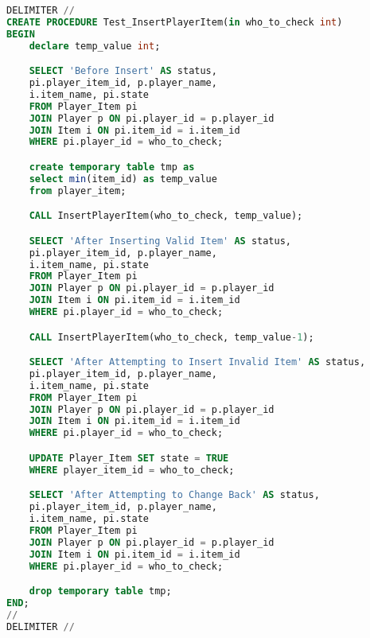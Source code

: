 \documentclass{article}
\begin{document}
\begin{lstlisting}[language=SQL]
DELIMITER //
CREATE PROCEDURE Test_InsertPlayerItem(in who_to_check int)
BEGIN
    declare temp_value int;

    SELECT 'Before Insert' AS status,
    pi.player_item_id, p.player_name,
    i.item_name, pi.state
    FROM Player_Item pi
    JOIN Player p ON pi.player_id = p.player_id
    JOIN Item i ON pi.item_id = i.item_id
    WHERE pi.player_id = who_to_check;

    create temporary table tmp as
    select min(item_id) as temp_value
    from player_item;

    CALL InsertPlayerItem(who_to_check, temp_value);

    SELECT 'After Inserting Valid Item' AS status,
    pi.player_item_id, p.player_name,
    i.item_name, pi.state
    FROM Player_Item pi
    JOIN Player p ON pi.player_id = p.player_id
    JOIN Item i ON pi.item_id = i.item_id
    WHERE pi.player_id = who_to_check;

    CALL InsertPlayerItem(who_to_check, temp_value-1);

    SELECT 'After Attempting to Insert Invalid Item' AS status,
    pi.player_item_id, p.player_name,
    i.item_name, pi.state
    FROM Player_Item pi
    JOIN Player p ON pi.player_id = p.player_id
    JOIN Item i ON pi.item_id = i.item_id
    WHERE pi.player_id = who_to_check;

    UPDATE Player_Item SET state = TRUE
    WHERE player_item_id = who_to_check;

    SELECT 'After Attempting to Change Back' AS status,
    pi.player_item_id, p.player_name,
    i.item_name, pi.state
    FROM Player_Item pi
    JOIN Player p ON pi.player_id = p.player_id
    JOIN Item i ON pi.item_id = i.item_id
    WHERE pi.player_id = who_to_check;

    drop temporary table tmp;
END;
//
DELIMITER //
\end{lstlisting}
\end{document}
